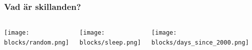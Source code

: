 \documentclass{beamer}
\begin{document}
\begin{frame}[fragile]
	\frametitle{Vad är skillanden?}
	
	\begin{columns}[c] %
		\begin{center}
			\texttt{[image: blocks/random.png]}
		\end{center}
		\begin{center}
			\texttt{[image: blocks/sleep.png]}
		\end{center}
		\begin{center}
			\texttt{[image: blocks/days\_since\_2000.png]}
		\end{center}
		\begin{lstlisting}[language=Python]

		\end{lstlisting}
		\begin{lstlisting}[language=Python]
time.sleep(1)		
		\end{lstlisting}
		\begin{lstlisting}[language=Python]
		
		\end{lstlisting}
	\end{columns}
\end{frame}
\end{document}
